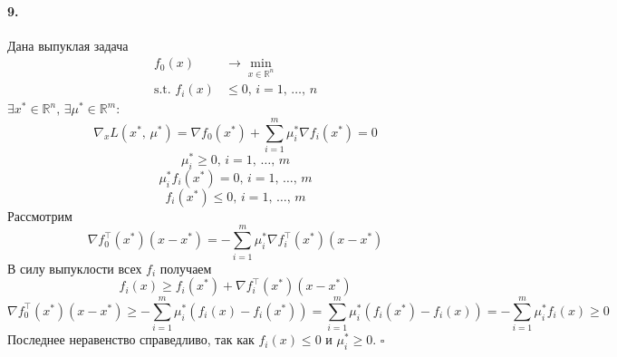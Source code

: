 \documentclass{article}
\newcommand*{\QED}{\null\nobreak\hfill\ensuremath{\square}}
\newcommand*{\R}{\mathbb{R}}
\newcommand*{\st}{\text{s.t. }}
\newcommand*{\1}{\mathbf{1}}
\begin{document}
\paragraph{9.} Дана выпуклая задача
\[ \begin{split}
    f_0(x) &\to \min\limits_{x \in \R^n} \\
    \st f_i(x) & \leqslant 0,\, i = 1,\, \dotsc,\, n
\end{split} \]
$\exists x^\ast \in \R^n,\, \exists \mu^\ast \in \R^m :\:$
\[ \nabla_x L(x^\ast,\, \mu^\ast) = \nabla f_0(x^\ast) + \sum\limits_{i = 1}^m \mu_i^\ast \nabla f_i(x^\ast) = 0 \]
\[ \mu_i^\ast \geqslant 0,\, i = 1,\, \dotsc,\, m \]
\[ \mu_i^\ast f_i(x^\ast) = 0,\, i = 1,\, \dotsc,\, m \]
\[ f_i(x^\ast) \leqslant 0,\, i = 1,\, \dotsc,\, m \]
Рассмотрим
\[ \nabla f_0^\top(x^\ast) (x - x^\ast) = -\sum\limits_{i = 1}^m \mu_i^\ast \nabla f_i^\top (x^\ast) (x - x^\ast) \]
В силу выпуклости всех $f_i$ получаем
\[ f_i(x) \geqslant f_i(x^\ast) + \nabla f_i^\top (x^\ast) (x - x^\ast) \]
\[ \nabla f_0^\top(x^\ast) (x - x^\ast) \geqslant -\sum\limits_{i = 1}^m \mu_i^\ast \left( f_i(x) - f_i(x^\ast) \right) = \sum\limits_{i = 1}^m \mu_i^\ast \left( f_i(x^\ast) - f_i(x) \right) = -\sum\limits_{i = 1}^m \mu_i^\ast f_i(x) \geqslant 0 \]
Последнее неравенство справедливо, так как $f_i(x) \leqslant 0$ и $\mu_i^\ast \geqslant 0$. \QED
\end{document}
